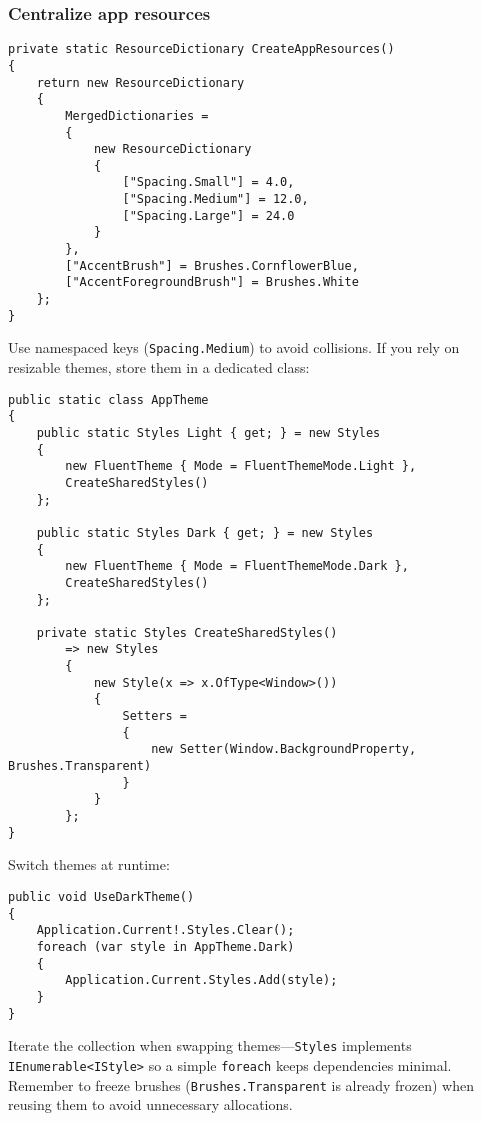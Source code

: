 \subsubsection{Centralize app resources}\label{centralize-app-resources}

\begin{lstlisting}
private static ResourceDictionary CreateAppResources()
{
    return new ResourceDictionary
    {
        MergedDictionaries =
        {
            new ResourceDictionary
            {
                ["Spacing.Small"] = 4.0,
                ["Spacing.Medium"] = 12.0,
                ["Spacing.Large"] = 24.0
            }
        },
        ["AccentBrush"] = Brushes.CornflowerBlue,
        ["AccentForegroundBrush"] = Brushes.White
    };
}
\end{lstlisting}

Use namespaced keys (\passthrough{\lstinline!Spacing.Medium!}) to avoid
collisions. If you rely on resizable themes, store them in a dedicated
class:

\begin{lstlisting}
public static class AppTheme
{
    public static Styles Light { get; } = new Styles
    {
        new FluentTheme { Mode = FluentThemeMode.Light },
        CreateSharedStyles()
    };

    public static Styles Dark { get; } = new Styles
    {
        new FluentTheme { Mode = FluentThemeMode.Dark },
        CreateSharedStyles()
    };

    private static Styles CreateSharedStyles()
        => new Styles
        {
            new Style(x => x.OfType<Window>())
            {
                Setters =
                {
                    new Setter(Window.BackgroundProperty, Brushes.Transparent)
                }
            }
        };
}
\end{lstlisting}

Switch themes at runtime:

\begin{lstlisting}
public void UseDarkTheme()
{
    Application.Current!.Styles.Clear();
    foreach (var style in AppTheme.Dark)
    {
        Application.Current.Styles.Add(style);
    }
}
\end{lstlisting}

Iterate the collection when swapping
themes---\passthrough{\lstinline!Styles!} implements
\passthrough{\lstinline!IEnumerable<IStyle>!} so a simple
\passthrough{\lstinline!foreach!} keeps dependencies minimal. Remember
to freeze brushes (\passthrough{\lstinline!Brushes.Transparent!} is
already frozen) when reusing them to avoid unnecessary allocations.

